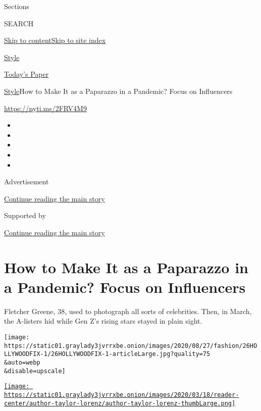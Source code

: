 Sections

SEARCH

\protect\hyperlink{site-content}{Skip to
content}\protect\hyperlink{site-index}{Skip to site index}

\href{https://www.nytimes3xbfgragh.onion/section/style}{Style}

\href{https://myaccount.nytimes3xbfgragh.onion/auth/login?response_type=cookie\&client_id=vi}{}

\href{https://www.nytimes3xbfgragh.onion/section/todayspaper}{Today's
Paper}

\href{/section/style}{Style}\textbar{}How to Make It as a Paparazzo in a
Pandemic? Focus on Influencers

\url{https://nyti.ms/2FRV4M9}

\begin{itemize}
\item
\item
\item
\item
\item
\end{itemize}

Advertisement

\protect\hyperlink{after-top}{Continue reading the main story}

Supported by

\protect\hyperlink{after-sponsor}{Continue reading the main story}

\hypertarget{how-to-make-it-as-a-paparazzo-in-a-pandemic-focus-on-influencers}{%
\section{How to Make It as a Paparazzo in a Pandemic? Focus on
Influencers}\label{how-to-make-it-as-a-paparazzo-in-a-pandemic-focus-on-influencers}}

Fletcher Greene, 38, used to photograph all sorts of celebrities. Then,
in March, the A-listers hid while Gen Z's rising stars stayed in plain
sight.

\texttt{[image: https://static01.graylady3jvrrxbe.onion/images/2020/08/27/fashion/26HOLLYWOODFIX-1/26HOLLYWOODFIX-1-articleLarge.jpg?quality=75\\\&auto=webp\\\&disable=upscale]}

\href{https://www.nytimes3xbfgragh.onion/by/taylor-lorenz}{\texttt{[image: https://static01.graylady3jvrrxbe.onion/images/2020/03/18/reader-center/author-taylor-lorenz/author-taylor-lorenz-thumbLarge.png]}}


